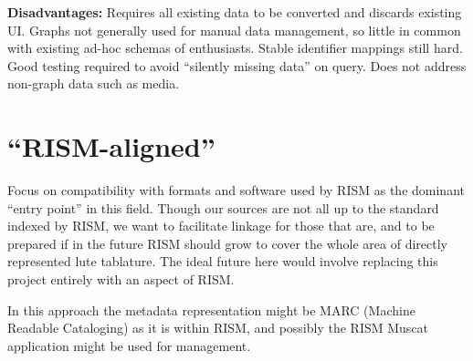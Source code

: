 \documentclass[a0,portrait]{a0poster}
\begin{document}
\begin{multicols}{3}
\begin{sloppypar}
  \noindent\textbf{Disadvantages:} Requires all existing data to be
  converted and discards existing UI. Graphs not generally used for
  manual data management, so little in common with existing ad-hoc
  schemas of enthusiasts. Stable identifier mappings still hard. Good
  testing required to avoid ``silently missing data'' on query. Does
  not address non-graph data such as media.
  
  \section{``RISM-aligned''}

  Focus on compatibility with formats and software used by RISM as the
  dominant ``entry point'' in this field. Though our sources are not
  all up to the standard indexed by RISM, we want to facilitate
  linkage for those that are, and to be prepared if in the future RISM
  should grow to cover the whole area of directly represented lute
  tablature. The ideal future here would involve replacing this
  project entirely with an aspect of RISM.

  \noindent In this approach the metadata representation might be MARC
  (Machine Readable Cataloging) as it is within RISM, and possibly the
  RISM Muscat application might be used for management.

\end{sloppypar}
  
\end{multicols}
\end{document}
